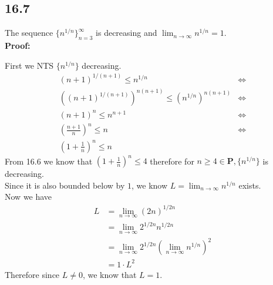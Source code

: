 \documentclass{article}
\begin{document}
\subsection*{16.7}
The sequence $\{n^{1/n}\}_{n=3}^{\infty}$ is decreasing and $\lim_{n \rightarrow \infty}n^{1/n} = 1$.\\
\textbf{Proof:}
\begin{addmargin}[1em]{0em}
    First we NTS $\{n^{1/n}\}$ decreasing.
    \begin{equation*}
        \begin{split}
            (n+1)^{1/(n+1)} \leq n^{1/n} &\iff \\
            ((n+1)^{1/(n+1)})^{n(n+1)} \leq (n^{1/n})^{n(n+1)} &\iff \\
            (n+1)^n \leq n^{n+1} &\iff \\
            \left(\frac{n+1}{n}\right)^n \leq n &\iff \\
            \left(
                1 + \frac{1}{n}
            \right)^n \leq n &
        \end{split}
    \end{equation*}
    From 16.6 we know that $\left(1+\frac{1}{n}\right)^n \leq 4$ therefore for $n \geq 4 \in \mathbf{P}, \{n^{1/n}\}$ is decreasing.\\
    Since it is also bounded below by $1$, we know $L = \lim_{n \rightarrow \infty} n^{1/n}$ exists.\\
    Now we have
    \begin{equation*}
        \begin{split}
            L &= \lim_{n\rightarrow \infty} (2n)^{1/2n} \\
            &= \lim_{n \rightarrow \infty} 2^{1/2n} n^{1/2n} \\
            &= \lim_{n \rightarrow \infty} 2^{1/2n} \left(\lim_{n \rightarrow \infty} n^{1/n}\right)^2 \\
            &= 1 \cdot L^2
        \end{split}
    \end{equation*}
    Therefore since $L \neq 0$, we know that $L = 1$.
\end{addmargin}
\end{document}
